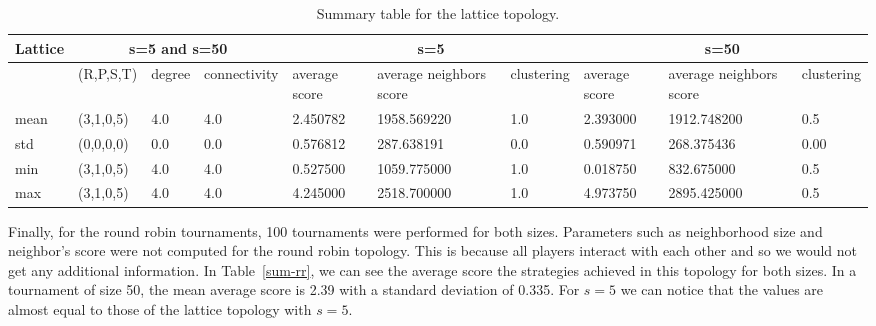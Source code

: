 \begin{table}[!hbtp]
\centering
\begin{adjustbox}{width=1\textwidth}
\small
\begin{tabular}{@{}|l|l|l|l|l|l|l|l|l|l|@{}}
\toprule
Lattice & \multicolumn{3}{c|}{s=5 and s=50} & \multicolumn{3}{c|}{s=5}                             & \multicolumn{3}{c|}{s=50}                            \\ \midrule
       & (R,P,S,T) & degree & connectivity & average score & average neighbors score & clustering & average score & average neighbors score & clustering \\ \midrule
mean   & (3,1,0,5) & 4.0    & 4.0          & 2.450782      & 1958.569220             & 1.0        & 2.393000      & 1912.748200             & 0.5        \\ \midrule
std    & (0,0,0,0) & 0.0    & 0.0          & 0.576812      & 287.638191              & 0.0        & 0.590971      & 268.375436              & 0.00       \\ \midrule
min    & (3,1,0,5) & 4.0    & 4.0          & 0.527500      & 1059.775000             & 1.0        & 0.018750      & 832.675000              & 0.5        \\ \midrule
max    & (3,1,0,5) & 4.0    & 4.0          & 4.245000      & 2518.700000             & 1.0        & 4.973750      & 2895.425000             & 0.5        \\ \bottomrule
\end{tabular}
\end{adjustbox}
\caption{Summary table for the lattice topology.}
\label{sum-lattice}
\end{table}

\newpage

Finally, for the round robin tournaments, 100 tournaments were performed for both
 sizes. Parameters such as neighborhood size and neighbor's score
were not computed for the round robin topology. This is because all players
interact with each other and so we would not get any additional information. In
Table~\ref{sum-rr}, we can see the average score the strategies achieved
in this topology for both sizes. In a tournament of size 50, the mean average
score is 2.39 with a standard deviation of 0.335. For \(s=5\) we can notice that the values
are almost equal to those of the lattice topology with \(s=5\). %

